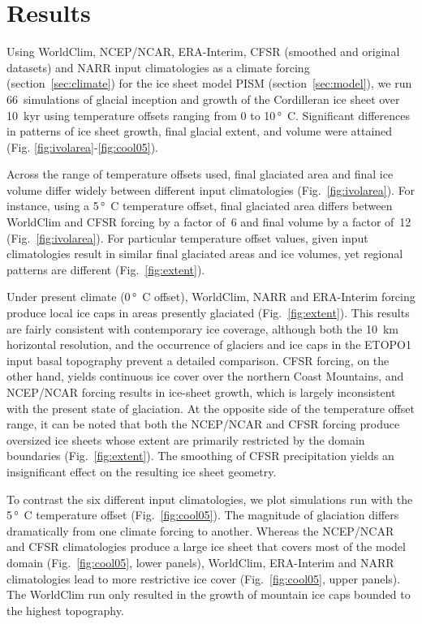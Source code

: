\section{Results}
\label{sec:results}

Using WorldClim, NCEP/NCAR, ERA-Interim, CFSR (smoothed and original datasets) and NARR input climatologies as a climate forcing (section~\ref{sec:climate}) for the ice sheet model PISM (section~\ref{sec:model}), we run 66~simulations of glacial inception and growth of the Cordilleran ice sheet over 10~kyr using temperature offsets ranging from 0 to 10\,\unit{\degree C}. Significant differences in patterns of ice sheet growth, final glacial extent, and volume were attained (Fig. \ref{fig:ivolarea}-\ref{fig:cool05}).

Across the range of temperature offsets used, final glaciated area and final ice volume differ widely between different input climatologies (Fig.~\ref{fig:ivolarea}). For instance, using a 5\,\unit{\degree C} temperature offset, final glaciated area differs between WorldClim and CFSR forcing by a factor of~6 and final volume by a factor of~12 (Fig.~\ref{fig:ivolarea}). For particular temperature offset values, given input climatologies result in similar final glaciated areas and ice volumes, yet regional patterns are different (Fig.~\ref{fig:extent}).

Under present climate (0\,\unit{\degree C} offset), WorldClim, NARR and ERA-Interim forcing produce local ice caps in areas presently glaciated (Fig.~\ref{fig:extent}). This results are fairly consistent with contemporary ice coverage, although both the 10~km horizontal resolution, and the occurrence of glaciers and ice caps in the ETOPO1 input basal topography prevent a detailed comparison. CFSR forcing, on the other hand, yields continuous ice cover over the northern Coast Mountains, and NCEP/NCAR forcing results in ice-sheet growth, which is largely inconsistent with the present state of glaciation. At the opposite side of the temperature offset range, it can be noted that both the NCEP/NCAR and CFSR forcing produce oversized ice sheets whose extent are primarily restricted by the domain boundaries (Fig.~\ref{fig:extent}). The smoothing of CFSR precipitation yields an insignificant effect on the resulting ice sheet geometry.

To contrast the six different input climatologies, we plot simulations run with the 5\,\unit{\degree C} temperature offset (Fig.~\ref{fig:cool05}). The magnitude of glaciation differs dramatically from one climate forcing to another. Whereas the NCEP/NCAR and CFSR climatologies produce a large ice sheet that covers most of the model domain (Fig.~\ref{fig:cool05}, lower panels), WorldClim, ERA-Interim and NARR climatologies lead to more restrictive ice cover (Fig.~\ref{fig:cool05}, upper panels). The WorldClim run only resulted in the growth of mountain ice caps bounded to the highest topography.

